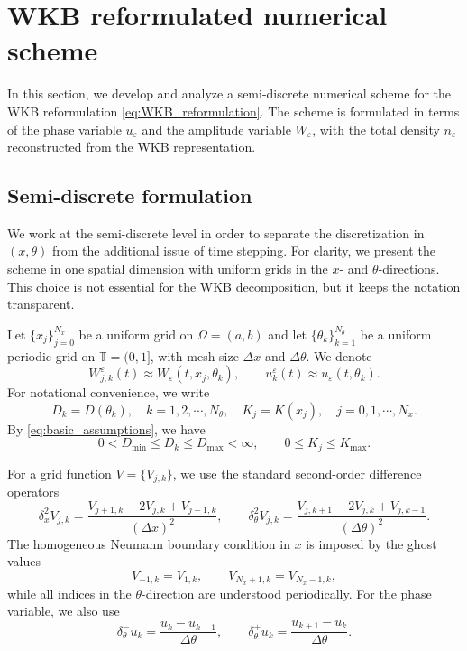 \documentclass[11pt]{article}
\numberwithin{equation}{section}
\begin{document}
\section{WKB reformulated numerical scheme}\label{sec:WKB_scheme}

In this section, we develop and analyze a semi-discrete numerical scheme for
the WKB reformulation \eqref{eq:WKB_reformulation}. The scheme is formulated
in terms of the phase variable \(u_\varepsilon\) and the amplitude variable
\(W_\varepsilon\), with the total density \(n_\varepsilon\) reconstructed from
the WKB representation.

\subsection{Semi-discrete formulation}

We work at the semi-discrete level in order to separate the discretization in
\((x,\theta)\) from the additional issue of time stepping. For clarity, we
present the scheme in one spatial dimension with uniform grids in the
\(x\)- and \(\theta\)-directions. This choice is not essential for the WKB
decomposition, but it keeps the notation transparent.

Let \(\{x_j\}_{j=0}^{N_x}\) be a uniform grid on \(\Omega=(a,b)\) and let
\(\{\theta_k\}_{k=1}^{N_\theta}\) be a uniform periodic grid on \(\mathbb T=(0,1]\),
with mesh size $\Delta x$ and \(\Delta\theta\). We denote
\[
W_{j,k}^\varepsilon(t)\approx W_\varepsilon(t,x_j,\theta_k),
\qquad
u_k^\varepsilon(t)\approx u_\varepsilon(t,\theta_k).
\]
For notational convenience, we write
\[
D_k=D(\theta_k), \quad k = 1,2,\cdots, N_\theta,
\quad
K_j=K(x_j), \quad j=0, 1,\cdots, N_x. 
\] 
By \eqref{eq:basic_assumptions}, we have 
\[
    0<D_{\min}\le D_k\le D_{\max}<\infty,
    \qquad
    0\le K_j\le K_{\max}.
\]


For a grid function \(V=\{V_{j,k}\}\), we use the standard second-order
difference operators
\[
\delta_x^2 V_{j,k}
=
\frac{V_{j+1,k}-2V_{j,k}+V_{j-1,k}}{(\Delta x)^2},
\qquad
\delta_\theta^2 V_{j,k}
=
\frac{V_{j,k+1}-2V_{j,k}+V_{j,k-1}}{(\Delta\theta)^2}.
\]
The homogeneous Neumann boundary condition in \(x\) is imposed by the ghost
values
\[
V_{-1,k}=V_{1,k},
\qquad
V_{N_x+1,k}=V_{N_x-1,k},
\]
while all indices in the \(\theta\)-direction are understood periodically.
For the phase variable, we also use
\[
\delta_\theta^-u_k
=
\frac{u_k-u_{k-1}}{\Delta\theta},
\qquad
\delta_\theta^+u_k
=
\frac{u_{k+1}-u_k}{\Delta\theta}.
\]
\end{document}
